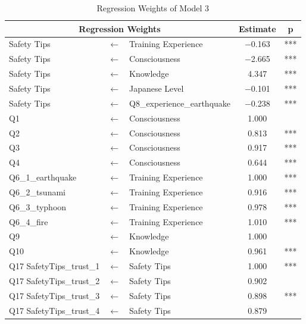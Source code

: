 \begin{table}[h]
\caption{Regression Weights of Model 3}
\label{table21}
\centering
\begin{tabular}{|l|c|l|c|c|}
\hline
\multicolumn{3}{|c|}{Regression Weights} & Estimate & p \\
\hline
Safety Tips & $\longleftarrow$ & Training Experience & $-$0.163 & *** \\
Safety Tips & $\longleftarrow$ & Consciousness & $-$2.665 & *** \\
Safety Tips & $\longleftarrow$ & Knowledge & 4.347 & *** \\
Safety Tips & $\longleftarrow$ & Japanese Level & $-$0.101 & *** \\
Safety Tips & $\longleftarrow$ & Q8\_experience\_earthquake & $-$0.238 & *** \\
Q1 & $\longleftarrow$ & Consciousness & 1.000 & \\
Q2 & $\longleftarrow$ & Consciousness & 0.813 & *** \\
Q3 & $\longleftarrow$ & Consciousness & 0.917 & *** \\
Q4 & $\longleftarrow$ & Consciousness & 0.644 & *** \\
Q6\_1\_earthquake & $\longleftarrow$ & Training Experience & 1.000 & *** \\
Q6\_2\_tsunami & $\longleftarrow$ & Training Experience & 0.916 & *** \\
Q6\_3\_typhoon & $\longleftarrow$ & Training Experience & 0.978 & *** \\
Q6\_4\_fire & $\longleftarrow$ & Training Experience & 1.010 & *** \\
Q9 & $\longleftarrow$ & Knowledge & 1.000 & \\
Q10 & $\longleftarrow$ & Knowledge & 0.961 & *** \\
Q17 SafetyTips\_trust\_1 & $\longleftarrow$ & Safety Tips & 1.000 & *** \\
Q17 SafetyTips\_trust\_2 & $\longleftarrow$ & Safety Tips & 0.902 & \\
Q17 SafetyTips\_trust\_3 & $\longleftarrow$ & Safety Tips & 0.898 & *** \\
Q17 SafetyTips\_trust\_4 & $\longleftarrow$ & Safety Tips & 0.879 & \\
\hline
\end{tabular}
\end{table}

